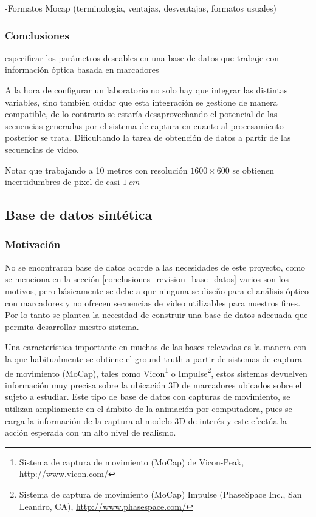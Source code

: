 -Formatos Mocap (terminología, ventajas, desventajas, formatos usuales)
\\



\subsubsection{Conclusiones}
especificar los parámetros deseables en una base de datos que trabaje con información óptica basada en marcadores


A la hora de configurar un laboratorio no solo hay que integrar las distintas variables, sino también cuidar que esta integración se gestione de manera compatible, de lo contrario se estaría desaprovechando el potencial de las secuencias generadas por el sistema de captura en cuanto al procesamiento posterior se trata. Dificultando la tarea de obtención de datos a partir de las secuencias de video.

Notar que trabajando a 10 metros con resolución $1600\times600$ se obtienen incertidumbres de pixel de casi $1 ~cm $

\subsection{Base de datos sintética}
\subsubsection{Motivación}

No se encontraron base de datos acorde a las necesidades de este proyecto, como se menciona en la sección \ref{conclusiones_revision_base_datos} varios son los motivos, pero básicamente se debe a que ninguna se diseño para el análisis óptico  con marcadores y no ofrecen secuencias de video utilizables para nuestros fines. Por lo tanto se plantea la necesidad de construir una base de datos adecuada que permita desarrollar nuestro sistema.


Una característica importante en muchas de las bases relevadas es la manera con la que habitualmente se obtiene el ground truth a partir de sistemas de captura de movimiento (MoCap), tales como Vicon\footnote{ Sistema  de captura de movimiento (MoCap) de Vicon-Peak, \textcolor{blue}{\underline{\url{http://www.vicon.com/}}} }
 o Impulse\footnote{ Sistema  de captura de movimiento (MoCap) Impulse (PhaseSpace Inc., San Leandro, CA), \textcolor{blue}{\underline{\url{http://www.phasespace.com/}}} },
estos sistemas devuelven información muy precisa sobre la ubicación 3D de marcadores ubicados sobre el sujeto a estudiar. Este tipo de base de datos con capturas de movimiento, se utilizan ampliamente en el ámbito de la animación por computadora, pues se carga la información de la captura al modelo 3D de interés y este efectúa la acción esperada con un alto nivel de realismo. 


